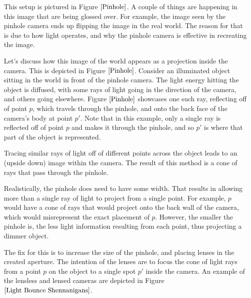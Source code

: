 \documentclass[
    12pt,
    twoside,
    bibstyle=chicago,
    headerstyle=uppercase,
	bibfile=thesis.bib
]{reedthesis}
\begin{document}
This setup is pictured in Figure $\ref{Pinhole}$. A couple of things are happening in this image that are being glossed over. For example, the image seen by the pinhole camera ends up flipping the image in the real world. The reason for that is due to how light operates, and why the pinhole camera is effective in recreating the image.

Let's discuss how this image of the world appears as a projection inside the camera. This is depicted in Figure $\ref{Pinhole}$. Consider an illuminated object sitting in the world in front of the pinhole camera. The light energy hitting the object is diffused, with some rays of light going in the direction of the camera, and others going elsewhere. Figure $\ref{Pinhole}$ showcases one such ray, reflecting off of point $p$, which travels through the pinhole, and onto the back face of the camera's body at point $p'$. Note that in this example, only a single ray is reflected off of point $p$ and makes it through the pinhole, and so $p'$ is where that part of the object is represented.

Tracing similar rays of light off of different points across the object leads to an (upside down) image within the camera. The result of this method is a cone of rays that pass through the pinhole.

Realistically, the pinhole does need to have some width. That results in allowing more than a single ray of light to project from a single point. For example, $p$ would have a cone of rays that would project onto the back wall of the camera, which would misrepresent the exact placement of $p$. However, the smaller the pinhole is, the less light information resulting from each point, thus projecting a dimmer object.

The fix for this is to increase the size of the pinhole, and placing lenses in the created aperture. The intention of the lenses are to focus the cone of light rays from a point $p$ on the object to a single spot $p'$ inside the camera. An example of the lensless and lensed cameras are depicted in Figure $\ref{Light Bounce Shennanigans}$. 

\end{document}
